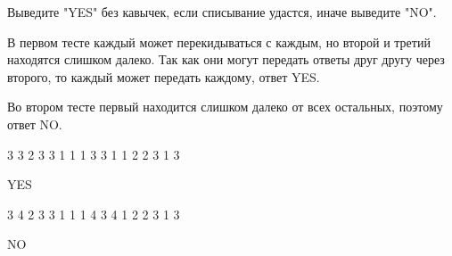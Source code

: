 \outputfmtSection

Выведите "YES" без кавычек, если списывание удастся, иначе выведите "NO".

\explanationSection

В первом тесте каждый может перекидываться с каждым, но второй и третий находятся слишком далеко. Так как они могут передать ответы друг другу через второго, то каждый может передать каждому, ответ YES.

Во втором тесте первый находится слишком далеко от всех остальных, поэтому ответ NO.


\begin{myverbbox}[\small]{\vinput}
    3 3 2
    3 3
    1 1
    1 3
    3 1
    1 2
    2 3
    1 3
\end{myverbbox}

\begin{myverbbox}[\small]{\voutput}
    YES
\end{myverbbox}


\begin{myverbbox}[\small]{\vinput}
    3 4 2
    3 3
    1 1
    1 4
    3 4
    1 2
    2 3
    1 3
\end{myverbbox}
\begin{myverbbox}[\small]{\voutput}
    NO
\end{myverbbox}

